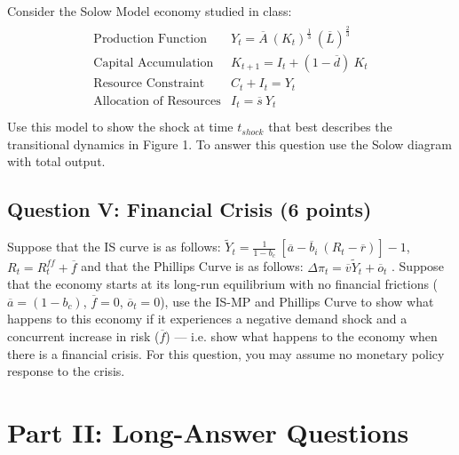 \documentclass[letterpaper,12pt]{article}
\theoremstyle{dotlessS}
\begin{document}
Consider the Solow Model economy studied in class:
\begin{eqnarray*}
\begin{array}{ll}
\text{Production Function} &Y_t=\overline{A} \: \left(K_t\right)^{\frac{1}{3}} \: \left(\overline{L}\right)^{\frac{2}{3}}\\[1.4ex]
\text{Capital Accumulation} &K_{t+1}=I_t+(1-\overline{d}) \: K_t \\[1.4ex]
\text{Resource Constraint} &C_t+I_t=Y_t  \\[1.4ex]
\text{Allocation of Resources} &I_t=\overline{s} \: Y_t  \\[1.4ex]
\end{array}
\end{eqnarray*}
Use this model to show the shock at time $t_{shock}$ that best describes the transitional dynamics in Figure 1. To answer this question use the Solow diagram with total output.

\subsection*{Question V: Financial Crisis (6 points)}
Suppose that the IS curve is as follows: $\widetilde{Y}_t=\frac{1}{1-b_c} \: [\overline{a}-\overline{b}_i \: (R_t-\overline{r})]-1$, $R_t=R^{ff}_t+\overline{f}$ and that the Phillips Curve is as follows: $\Delta \pi_t=\overline{v}\widetilde{Y}_t+\overline{o}_t$ . Suppose that the economy starts at its long-run equilibrium with no financial frictions ($\overline{a}=(1-b_c)$, $\overline{f}=0$, $\overline{o}_t=0$), use the IS-MP and Phillips Curve to show what happens to this economy if it experiences a negative demand shock and a concurrent increase in risk ($\overline{f}$) --- i.e. show what happens to the economy when there is a financial crisis. For this question, you may assume no monetary policy response to the crisis. 

\section{Part II: Long-Answer Questions}
\end{document}
